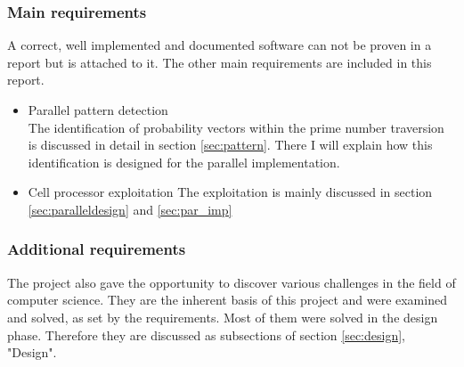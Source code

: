 \subsubsection{Main requirements}
\label{sec:main_req}
A correct, well implemented and documented software can not be proven in a report but is attached to it. The other main requirements are included in this report.

\begin{itemize}%
   \item Parallel pattern detection\\
      The identification of probability vectors within the prime number traversion is discussed in detail in section \ref{sec:pattern}. There I will explain how this identification is designed for the parallel implementation.
   \item Cell processor exploitation
      The exploitation is mainly discussed in section \ref{sec:paralleldesign} and \ref{sec:par_imp}
\end{itemize}%


\subsubsection{Additional requirements}
\label{sec:additional_req}
The project also gave the opportunity to discover various challenges in the field of computer science. They are the inherent basis of this project and were examined and solved, as set by the requirements. Most of them were solved in the design phase. Therefore they are discussed as subsections of  section \ref{sec:design}, "Design".


